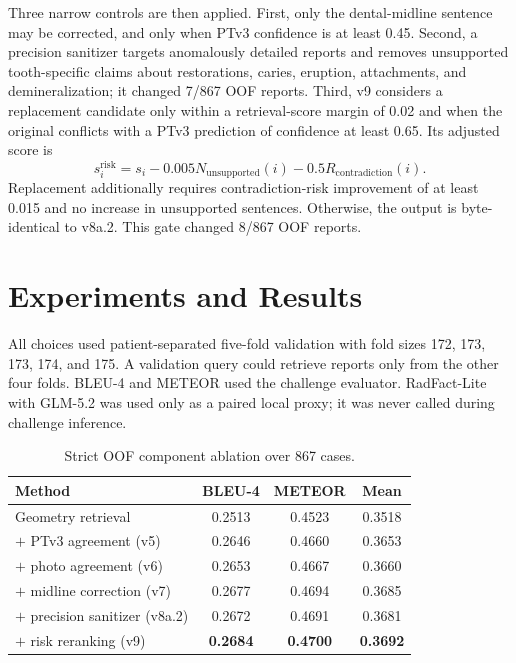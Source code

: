 \documentclass[runningheads]{llncs}
\begin{document}
Three narrow controls are then applied. First, only the dental-midline sentence may be corrected, and only when PTv3 confidence is at least 0.45. Second, a precision sanitizer targets anomalously detailed reports and removes unsupported tooth-specific claims about restorations, caries, eruption, attachments, and demineralization; it changed 7/867 OOF reports. Third, v9 considers a replacement candidate only within a retrieval-score margin of 0.02 and when the original conflicts with a PTv3 prediction of confidence at least 0.65. Its adjusted score is
\begin{equation}
s_i^{\mathrm{risk}}=s_i-0.005N_{\mathrm{unsupported}}(i)-0.5R_{\mathrm{contradiction}}(i).
\end{equation}
Replacement additionally requires contradiction-risk improvement of at least 0.015 and no increase in unsupported sentences. Otherwise, the output is byte-identical to v8a.2. This gate changed 8/867 OOF reports.

\section{Experiments and Results}

All choices used patient-separated five-fold validation with fold sizes 172, 173, 173, 174, and 175. A validation query could retrieve reports only from the other four folds. BLEU-4 and METEOR used the challenge evaluator. RadFact-Lite \cite{radfact} with GLM-5.2 \cite{glm} was used only as a paired local proxy; it was never called during challenge inference.

\begin{table}[t]
\centering
\caption{Strict OOF component ablation over 867 cases.}
\label{tab:ablation}
\small
\begin{tabular}{lccc}
\toprule
Method & BLEU-4 & METEOR & Mean \\
\midrule
Geometry retrieval & 0.2513 & 0.4523 & 0.3518 \\
$+$ PTv3 agreement (v5) & 0.2646 & 0.4660 & 0.3653 \\
$+$ photo agreement (v6) & 0.2653 & 0.4667 & 0.3660 \\
$+$ midline correction (v7) & 0.2677 & 0.4694 & 0.3685 \\
$+$ precision sanitizer (v8a.2) & 0.2672 & 0.4691 & 0.3681 \\
$+$ risk reranking (v9) & \textbf{0.2684} & \textbf{0.4700} & \textbf{0.3692} \\
\bottomrule
\end{tabular}
\end{table}
\end{document}
